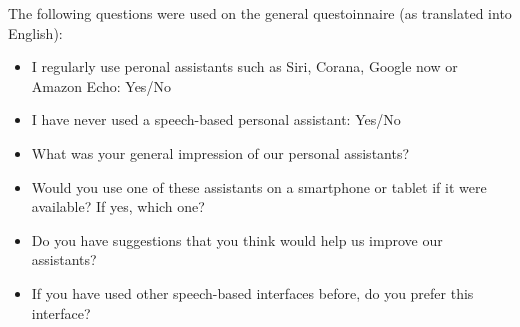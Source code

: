 \documentclass[11pt]{article}
\begin{document}
The following questions were used on the general questoinnaire (as translated into English):
\begin{itemize}
 \item I regularly use peronal assistants such as Siri, Corana, Google now or Amazon Echo: Yes/No
 \item I have never used a speech-based personal assistant: Yes/No
 \item What was your general impression of our personal assistants?
 \item Would you use one of these assistants on a smartphone or tablet if it were available? If yes, which one?
 \item Do you have suggestions that you think would help us improve our assistants?
 \item If you have used other speech-based interfaces before, do you prefer this interface?
\end{itemize}




\end{document}
